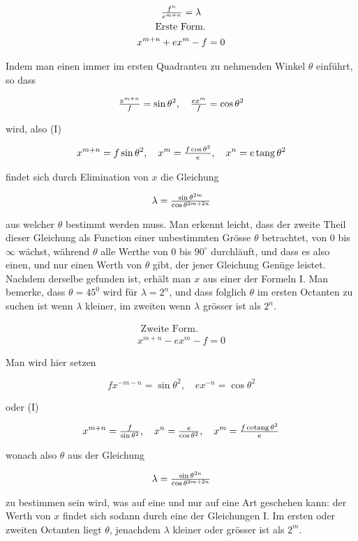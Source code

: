 \documentclass[twoside,12pt, showframe]{memoir}
\let\oldfrac\frac
\def\frac#1#2{\mathchoice{\tfrac{#1}{#2}}{\oldfrac{#1}{#2}}{\genfrac{}{}{}{2}{#1}{#2\mathstrut}}{\genfrac{}{}{}{3}{#1}{#2\mathstrut}}}
\begin{document}
\[
\begin{gathered}
\frac{f^{n}}{e^{m+n}}=\lambda \\
\text { Erste Form. } \\
x^{m+n}+e x^{m}-f=0
\end{gathered}
\]

Indem man einen immer im ersten Quadranten zu nehmenden Winkel \(\theta\) einführt, so dass

\[
\frac{x^{m+n}}{f}=\sin \theta^{2}, \quad \frac{e x^{m}}{f}=\cos \theta^{2}
\]

wird, also (I)

\[
x^{m+n}=f \sin \theta^{2}, \quad x^{m}=\frac{f \cos \theta^{2}}{e}, \quad x^{n}=e \operatorname{tang} \theta^{2}
\]

findet sich durch Elimination von \(x\) die Gleichung

\[
\lambda=\frac{\sin \theta^{2 m}}{\cos \theta^{2 m+2 n}}
\]

aus welcher \(\theta\) bestimmt werden muss. Man erkennt leicht, dass der zweite Theil dieser Gleichung als Function einer unbestimmten Grösse \(\theta\) betrachtet, von 0
bis \(\infty\) wächst, während \(\theta\) alle Werthe von 0 bis \(90^{\circ}\) durchläuft, und dass es also einen, und nur einen Werth von \(\theta\) gibt, der jener Gleichung Genüge leistet. Nachdem derselbe gefunden ist, erhält man \(x\) aus einer der Formeln I. Man bemerke, dass \(\theta=45^{0}\) wird für \(\lambda=2^{n}\), und dass folglich \(\theta\) im ersten Octanten zu suchen ist wenn \(\lambda\) kleiner, im zweiten wenn \(\lambda\) grösser ist als \(2^{n}\).

\[
\begin{gathered}
\text { Zweite Form. } \\
x^{m+n}-e x^{m}-f=0
\end{gathered}
\]

Man wird hier setzen

\[
f x^{-m-n}=\sin \theta^{2}, \quad e x^{-n}=\cos \theta^{2}
\]

oder (I)

\[
x^{m+n}=\frac{f}{\sin \theta^{2}}, \quad x^{n}=\frac{e}{\cos \theta^{2}}, \quad x^{m}=\frac{f \operatorname{cotang} \theta^{2}}{e}
\]

wonach also \(\theta\) aus der Gleichung

\[
\lambda=\frac{\sin \theta^{2 n}}{\cos \theta^{2 m+2 n}}
\]

zu bestimmen sein wird, was auf eine und nur auf eine Art geschehen kann: der Werth von \(x\) findet sich sodann durch eine der Gleichungen I. Im ersten oder zweiten Octanten liegt \(\theta\), jenachdem \(\lambda\) kleiner oder grösser ist als \(2^{m}\).
\end{document}
